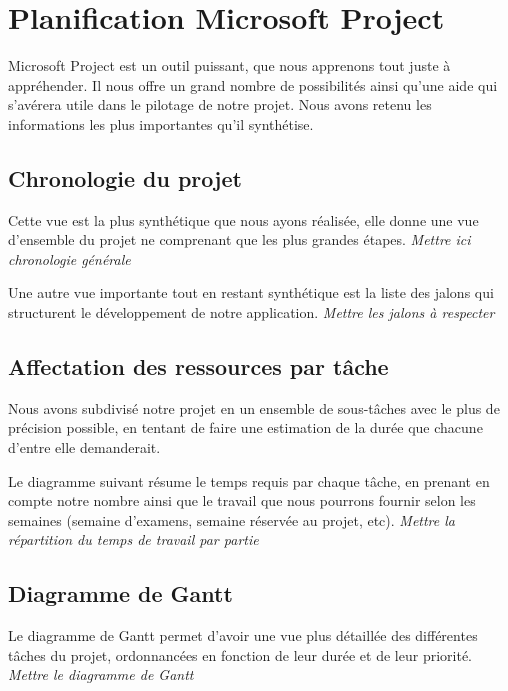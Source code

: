 \section{Planification Microsoft Project}

Microsoft Project est un outil puissant, que nous apprenons tout juste à appréhender. Il nous offre un grand nombre de possibilités ainsi qu'une aide qui s'avérera utile dans le pilotage de notre projet. Nous avons retenu les informations les plus importantes qu'il synthétise.

\subsection{Chronologie du projet}
Cette vue est la plus synthétique que nous ayons réalisée, elle donne une vue d’ensemble du projet ne comprenant que les plus grandes étapes. \newline
\emph{Mettre ici chronologie générale}\newline

Une autre vue importante tout en restant synthétique est la liste des jalons qui structurent le développement de notre application.\newline
\emph{Mettre les jalons à respecter}

\subsection{Affectation des ressources par tâche}
Nous avons subdivisé notre projet en un ensemble de sous-tâches avec le plus de précision possible, en tentant de faire une estimation de la durée que chacune d'entre elle demanderait.\newline

Le diagramme suivant résume le temps requis par chaque tâche, en prenant en compte notre nombre ainsi que le travail que nous pourrons fournir selon les semaines (semaine d'examens, semaine réservée au projet, etc).\newline
\emph{Mettre la répartition du temps de travail par partie}

\subsection{Diagramme de Gantt}
Le diagramme de Gantt permet d'avoir une vue plus détaillée des différentes tâches du projet, ordonnancées en fonction de leur durée et de leur priorité. \newline
\emph{Mettre le diagramme de Gantt}